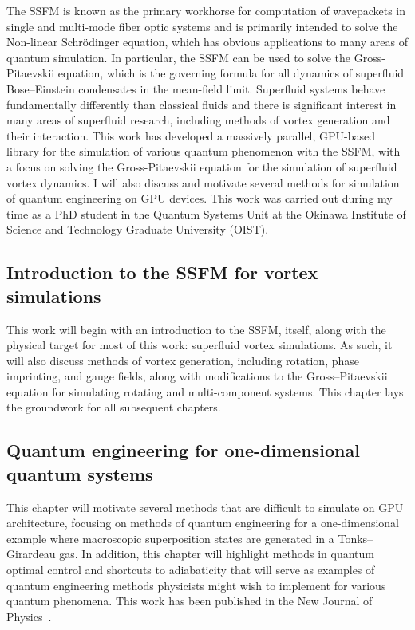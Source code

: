 The SSFM is known as the primary workhorse for computation of wavepackets in single and multi-mode fiber optic systems and is primarily intended to solve the Non-linear Schr\"odinger equation, which has obvious applications to many areas of quantum simulation.
In particular, the SSFM can be used to solve the Gross-Pitaevskii equation, which is the governing formula for all dynamics of superfluid Bose--Einstein condensates in the mean-field limit.
Superfluid systems behave fundamentally differently than classical fluids and there is significant interest in many areas of superfluid research, including methods of vortex generation and their interaction.
This work has developed a massively parallel, GPU-based library for the simulation of various quantum phenomenon with the SSFM, with a focus on solving the Gross-Pitaevskii equation for the simulation of superfluid vortex dynamics.
I will also discuss and motivate several methods for simulation of quantum engineering on GPU devices.
This work was carried out during my time as a PhD student in the Quantum Systems Unit at the Okinawa Institute of Science and Technology Graduate University (OIST).

\subsection*{Introduction to the SSFM for vortex simulations}

This work will begin with an introduction to the SSFM, itself, along with the physical target for most of this work: superfluid vortex simulations.
As such, it will also discuss methods of vortex generation, including rotation, phase imprinting, and gauge fields, along with modifications to the Gross--Pitaevskii equation for simulating rotating and multi-component systems.
This chapter lays the groundwork for all subsequent chapters.

\subsection*{Quantum engineering for one-dimensional quantum systems}

This chapter will motivate several methods that are difficult to simulate on GPU architecture, focusing on methods of quantum engineering for a one-dimensional example where macroscopic superposition states are generated in a Tonks--Girardeau gas.
In addition, this chapter will highlight methods in quantum optimal control and shortcuts to adiabaticity that will serve as examples of quantum engineering methods physicists might wish to implement for various quantum phenomena.
This work has been published in the New Journal of Physics~\cite{schloss2016}.


